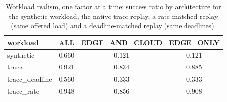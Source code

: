 \begin{table}[t]
\centering
\footnotesize
\caption{Workload realism, one factor at a time: success ratio by architecture for the synthetic workload, the native trace replay, a rate-matched replay (same offered load) and a deadline-matched replay (same deadlines).}
\label{tab:p1-trace}
\begin{tabular}{lccc}
\toprule
workload & ALL & EDGE\_AND\_CLOUD & EDGE\_ONLY \\
\midrule
synthetic & 0.660 & 0.121 & 0.121 \\
trace & 0.921 & 0.834 & 0.885 \\
trace\_deadline & 0.560 & 0.333 & 0.333 \\
trace\_rate & 0.948 & 0.856 & 0.908 \\
\bottomrule
\end{tabular}
\par\vspace{2pt}{\footnotesize\raggedright All four arms use the same 1 s control interval, so the differences are workload properties, not temporal ones. The native trace contributes 781 requests inside the horizon; the rate-matched arm resamples 1,990 onto the same horizon, which is what rules load out.\par}
\end{table}
